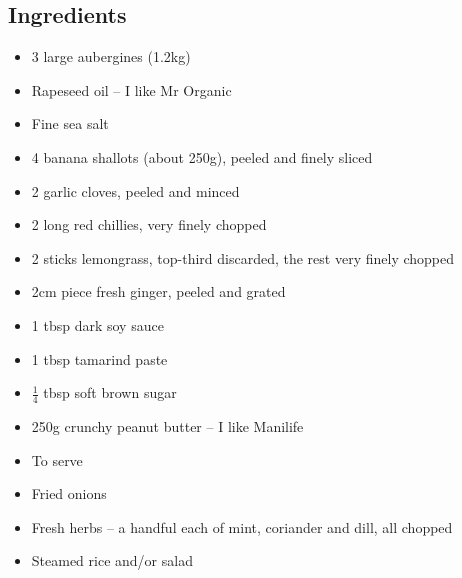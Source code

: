 \documentclass{book}
\begin{document}
\subsection*{Ingredients}
\begin{itemize}
\item 3 large aubergines (1.2kg)
\item Rapeseed oil – I like Mr Organic
\item Fine sea salt
\item 4 banana shallots (about 250g), peeled and finely sliced
\item 2 garlic cloves, peeled and minced
\item 2 long red chillies, very finely chopped
\item 2 sticks lemongrass, top-third discarded, the rest very finely chopped
\item 2cm piece fresh ginger, peeled and grated
\item 1 tbsp dark soy sauce
\item 1 tbsp tamarind paste
\item $\frac{1}{4}$ tbsp soft brown sugar
\item 250g crunchy peanut butter – I like Manilife
\end{itemize}

\begin{itemize}
\item To serve
\item Fried onions
\item Fresh herbs – a handful each of mint, coriander and dill, all chopped
\item Steamed rice and/or salad
\end{itemize}
\end{document}
